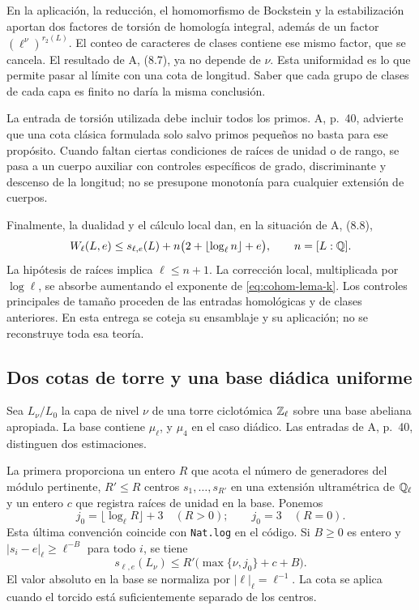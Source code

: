 En la aplicación, la reducción, el homomorfismo de
Bockstein y la estabilización aportan dos factores
de torsión de homología integral, además de un factor
$(\ell^\nu)^{r_2(L)}$.
El conteo de caracteres de clases contiene ese mismo
factor, que se cancela. El resultado de A, (8.7),
ya no depende de $\nu$.
Esta uniformidad es lo que permite pasar al límite
con una cota de longitud.
Saber que cada grupo de clases de cada capa es finito
no daría la misma conclusión.

La entrada de torsión utilizada debe incluir todos los
primos. A, p.~40, advierte que una cota clásica formulada
solo salvo primos pequeños no basta para ese propósito.
Cuando faltan ciertas condiciones de raíces de unidad
o de rango, se pasa a un cuerpo auxiliar con controles
específicos de grado, discriminante y descenso de la
longitud; no se presupone monotonía para cualquier
extensión de cuerpos.

Finalmente, la dualidad y el cálculo local dan, en la
situación de A, (8.8),
\begin{equation}
 W_\ell(L,e)
 \le s_{\ell,e}(L)
     +n\bigl(2+\lfloor\log_\ell n\rfloor+e\bigr),
 \qquad n=[L:\mathbb{Q}].
 \label{eq:cohom-correccion-local}
\end{equation}
La hipótesis de raíces implica $\ell\le n+1$.
La corrección local, multiplicada por $\log\ell$,
se absorbe aumentando el exponente de
\eqref{eq:cohom-lema-k}.
Los controles principales de tamaño proceden de las
entradas homológicas y de clases anteriores.
En esta entrega se coteja su ensamblaje y su aplicación;
no se reconstruye toda esa teoría.

\subsection{Dos cotas de torre y una base diádica uniforme}

Sea $L_\nu/L_0$ la capa de nivel $\nu$ de una torre
ciclotómica $\mathbb{Z}_\ell$ sobre una base abeliana apropiada.
La base contiene $\mu_\ell$, y $\mu_4$ en el caso diádico.
Las entradas de A, p.~40, distinguen dos estimaciones.

La primera proporciona un entero $R$ que acota el
número de generadores del módulo pertinente,
$R'\le R$ centros $s_1,\ldots,s_{R'}$ en una extensión
ultramétrica de $\mathbb{Q}_\ell$ y un entero $c$ que registra
raíces de unidad en la base. Ponemos
\[
 j_0=\lfloor\log_\ell R\rfloor+3\quad(R>0);
 \qquad j_0=3\quad(R=0).
\]
Esta última convención coincide con
\texttt{Nat.log} en el código.
Si $B\ge0$ es entero y
$|s_i-e|_\ell\ge\ell^{-B}$ para todo $i$, se tiene
\begin{equation}
 s_{\ell,e}(L_\nu)
 \le R'\bigl(\max\{\nu,j_0\}+c+B\bigr).
 \label{eq:cohom-torre-ordinaria}
\end{equation}
El valor absoluto en la base se normaliza por
$|\ell|_\ell=\ell^{-1}$.
La cota se aplica cuando el torcido está suficientemente
separado de los centros.

